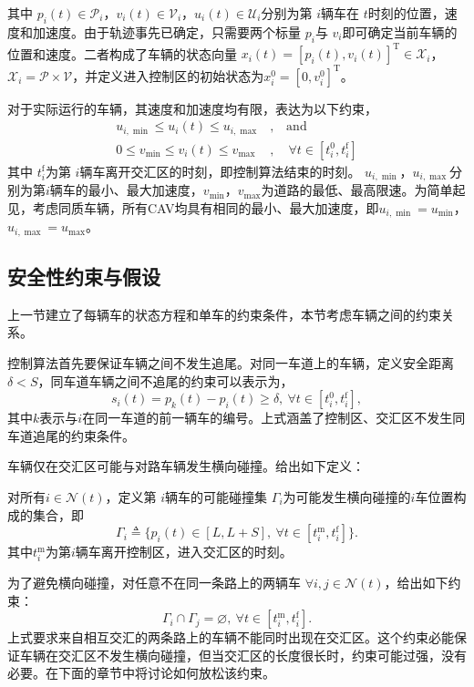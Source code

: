 其中 $p_i(t)\in \mathcal{P}_i$，$v_i(t)\in \mathcal{V}_i$，$u_i(t)\in \mathcal{U}_i$分别为第 $i$辆车在 $t$时刻的位置，速度和加速度。由于轨迹事先已确定，只需要两个标量 $p_i$与 $v_i$即可确定当前车辆的位置和速度。二者构成了车辆的状态向量 $x_i(t)=[p_i(t), v_i(t)]^\mathrm{T}\in \mathcal{X}_i$，$\mathcal{X}_i=\mathcal{P}\times\mathcal{V}$，并定义进入控制区的初始状态为$x_i^0 = [0, v_i^0]^\mathrm{T}$。

对于实际运行的车辆，其速度和加速度均有限，表达为以下约束，
\begin{equation}
\begin{aligned}
u_{i,\min}\leq u_i(t)\leq u_{i,\max}&, \quad \text{and}\\
0\leq v_{\min}\leq v_i(t)\leq v_{\max}&, \quad \forall t\in[t_i^0, t_i^\mathrm{f}]
\end{aligned}
\label{eq:single_constraint}
\end{equation}
其中 $t_i^\mathrm{f}$为第 $i$辆车离开交汇区的时刻，即控制算法结束的时刻。 $u_{i,\min}$，$u_{i,\max}$分别为第$i$辆车的最小、最大加速度，$v_{\min}$，$v_{\max}$为道路的最低、最高限速。为简单起见，考虑同质车辆，所有CAV均具有相同的最小、最大加速度，即$u_{i,\min}=u_{\min}$，$u_{i,\max}=u_{\max}$。

\subsection{安全性约束与假设}
上一节建立了每辆车的状态方程和单车的约束条件，本节考虑车辆之间的约束关系。

控制算法首先要保证车辆之间不发生追尾。对同一车道上的车辆，定义安全距离$\delta < S$，同车道车辆之间不追尾的约束可以表示为，
\begin{equation}
s_i(t)=p_k(t)-p_i(t)\geq \delta, \ \forall t\in [t_i^0, t_i^\mathrm{f}],
\label{eq:colli_rear}
\end{equation}
其中$k$表示与$i$在同一车道的前一辆车的编号。上式涵盖了控制区、交汇区不发生同车道追尾的约束条件。

车辆仅在交汇区可能与对路车辆发生横向碰撞。给出如下定义：
\begin{definition}
对所有$i\in \mathcal{N}(t)$，定义第 $i$辆车的可能碰撞集 $\Gamma_i$为可能发生横向碰撞的$i$车位置构成的集合，即
\begin{equation}
\Gamma_i\triangleq \{p_i(t)\in[L,L+S],\  \forall t\in [t_i^\mathrm{m},t_i^\mathrm{f}]\}.
\end{equation}
其中$t_i^\mathrm{m}$为第$i$辆车离开控制区，进入交汇区的时刻。
\end{definition}
为了避免横向碰撞，对任意不在同一条路上的两辆车 $\forall i,j\in \mathcal{N}(t)$，给出如下约束：
\begin{equation}
\Gamma_i\cap \Gamma_j=\varnothing, \ \forall t\in [t_i^\mathrm{m},t_i^\mathrm{f}].
\label{eq:colli_lateral}
\end{equation}
上式要求来自相互交汇的两条路上的车辆不能同时出现在交汇区。这个约束必能保证车辆在交汇区不发生横向碰撞，但当交汇区的长度很长时，约束可能过强，没有必要。在下面的章节中将讨论如何放松该约束。

